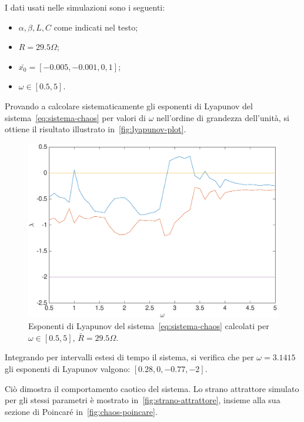 I dati usati nelle simulazioni sono i seguenti:
\begin{itemize}
    \item $\alpha, \beta, L, C$ come indicati nel testo;
    \item $R=29.5 \Omega$;
    \item $\bar{x_0} = [-0.005, -0.001, 0, 1]$;
    \item $\omega \in [0.5, 5]$.
\end{itemize}

Provando a calcolare sistematicamente gli esponenti di Lyapunov del sistema~\ref{eq:sistema-chaos} per valori di $\omega$ nell'ordine di grandezza dell'unità, si ottiene il risultato illustrato in~\autoref{fig:lyapunov-plot}.

\begin{figure}
    \centering
    \includegraphics[width=\textwidth]{matcont/LyapunovPlot}
    \caption{Esponenti di Lyapunov del sistema~\ref{eq:sistema-chaos} calcolati per $\omega \in [0.5, 5]$, $\bar{R}=29.5 \Omega$.}
    \label{fig:lyapunov-plot}
\end{figure}

Integrando per intervalli estesi di tempo il sistema, si verifica che per $\omega = 3.1415$ gli esponenti di Lyapunov valgono: $[0.28, 0, -0.77, -2]$.

Ciò dimostra il comportamento caotico del sistema. Lo strano attrattore simulato per gli stessi parametri è mostrato in~\autoref{fig:strano-attrattore}, insieme alla sua sezione di Poincaré in~\autoref{fig:chaos-poincare}.


